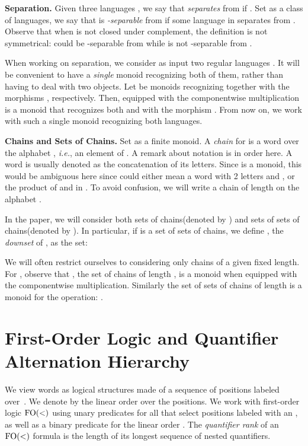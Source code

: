 \documentclass[envcountsame]{llncs}
\newcommand{\fow}{\ensuremath{\textup{FO}(<)}\xspace}
\newcommand\chain{chain\xspace}
\newcommand\chains{chains\xspace}
\newcommand\Chains{Chains\xspace}
\begin{document}
\medskip\noindent
{\bf Separation.} Given three languages , we say that 
\emph{separates}  from  if . Set  as a class of languages, we say that
 is \emph{-separable} from  if some language in 
separates  from . Observe that when  is not closed under
complement, the definition is not symmetrical:  could be
-separable from  while  is not -separable from .

When working on separation, we consider as input two regular languages
. It will be convenient to have a \emph{single} monoid recognizing
both of them, rather than having to deal with two objects. Let  be monoids recognizing  together with the morphisms
, respectively. Then,  equipped
with the componentwise multiplication  is a monoid that recognizes both  and  with
the morphism . From now
on, we work with such a single monoid recognizing both languages.



\medskip
\noindent
{\bf \Chains and Sets of \Chains.} Set  as a finite monoid. A
\emph{\chain } for  is a word over the alphabet , \emph{i.e.}, an
element of . A remark about notation is in order here. A word is
usually denoted as the concatenation of its letters. Since  is a
monoid, this would be ambiguous here since  could either mean a
word with 2 letters  and , or the product of  and  in
. To avoid confusion, we will write  a \chain of
length  on the alphabet .

In the paper, we will consider both sets of \chains (denoted by
) and sets of sets of \chains (denoted by ). In particular, if  is a set of sets of \chains, we define
, the \emph{downset} of , as the set:

We will often restrict ourselves to considering only \chains of a
given fixed length. For , observe that , the set of
\chains of length , is a monoid when equipped with the
componentwise multiplication. Similarly the set  of sets of \chains of
length  is a monoid for the operation: .


\section{First-Order Logic and Quantifier Alternation Hierarchy}
\label{sec:logic}
We view words as logical structures made of a sequence of positions labeled
over~. We denote by  the linear order over the positions. We work with
first-order logic \fow using unary predicates  for all  that
select positions labeled with an , as well as a binary predicate for the
linear order . The \emph{quantifier rank} of an \fow formula is the length
of its longest sequence of nested quantifiers.
\end{document}
